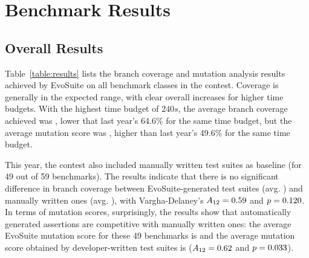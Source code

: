 \documentclass[sigconf,table]{acmart}
\newcommand{\EVOSUITE}{{\sc EvoSuite}\xspace}
\begin{document}
\section{Benchmark Results}

\begin{table*}[t]
  \centering
  \caption{\label{table:results}Detailed results of \EVOSUITE on the SBST benchmark classes.}
\resizebox{0.7\textwidth}{!}{  

}	
\end{table*}

% 

% 

\subsection{Overall Results}

Table~\ref{table:results} lists the branch coverage and mutation
analysis results achieved by \EVOSUITE on all benchmark classes in the
contest. Coverage is generally in the expected range, with clear
overall increases for higher time budgets. With the highest time
budget of $240s$, the average branch coverage achieved was \AvgCovD,
lower that last year's 64.6\% for the same time budget, but the
average mutation score was \AvgMutD, higher than last year's 49.6\%
for the same time budget.

This year, the contest also included manually written test suites as
baseline (for 49 out of 59 benchmarks). The results indicate that
there is no significant difference in branch coverage between
\EVOSUITE-generated test suites (avg. \AvgCovEvosuite) and manually
written ones (avg. \AvgCovManual), with Vargha-Delaney's
$A_{12}={0.59}$ and $p={{0.120}}$. In terms of mutation
scores, surprisingly, the results show that automatically generated
assertions are competitive with manually written ones: the average
\EVOSUITE mutation score for these 49 benchmarks is \AvgMutEvosuite
and the average mutation score obtained by developer-written test
suites is \AvgMutManual ($A_{12}={0.62}$ and
$p={{0.033}}$).
\end{document}
